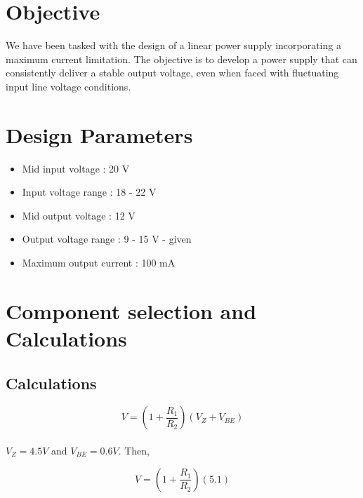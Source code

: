 \documentclass[12pt, a4paper]{article}
\begin{document}


\section{Objective}

We have been tasked with the design of a linear power supply incorporating a maximum current limitation. The objective is to develop a power supply that can consistently deliver a stable output voltage, even when faced with fluctuating input line voltage conditions.

\section{Design Parameters}

\begin{itemize}
  \item Mid input voltage : 20 V
  \item Input voltage range : 18 - 22 V
  \item Mid output voltage : 12 V
  \item Output voltage range : 9 - 15 V - given
  \item Maximum output current : 100 mA
\end{itemize}

\section{Component selection and Calculations}
\subsection{Calculations}

\begin{equation}
V = \left(1+\frac{R_1}{R_2}\right)(V_Z + V_{BE})   
\end{equation}
\\
$V_Z = 4.5 V$ and $V_{BE} = 0.6 V$. Then,

\begin{equation*}
V = \left(1+\frac{R_1}{R_2}\right)(5.1)
\end{equation*}
\end{document}
